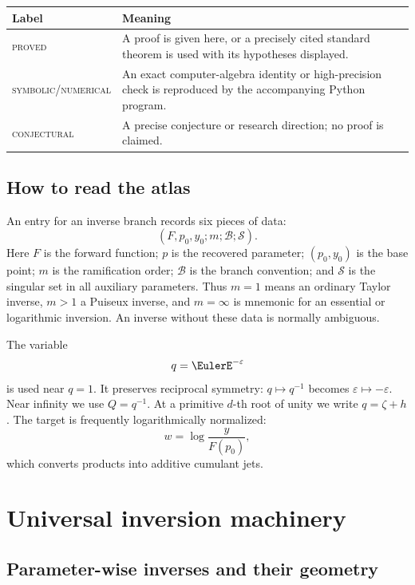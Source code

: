 \documentclass[11pt,letterpaper,oneside,openany]{book}
\theoremstyle{definition}
\theoremstyle{remark}
\newcommand{\statusproved}{\textcolor{provedgreen}{\textsc{proved}}}
\newcommand{\statusnumerical}{\textcolor{numericalblue}{\textsc{symbolic/numerical}}}
\newcommand{\statusconjectural}{\textcolor{conjectureorange}{\textsc{conjectural}}}
\begin{document}
\begin{center}
\begin{tabularx}{0.96\textwidth}{@{}lX@{}}
\toprule
Label & Meaning \\
\midrule
\statusproved & A proof is given here, or a precisely cited standard theorem is
used with its hypotheses displayed. \\
\statusnumerical & An exact computer-algebra identity or high-precision check is
reproduced by the accompanying Python program. \\
\statusconjectural & A precise conjecture or research direction; no proof is
claimed. \\
\bottomrule
\end{tabularx}
\end{center}

\chapter*{How to read the atlas}
An entry for an inverse branch records six pieces of data:
\[
 (F,p_0,y_0;m;\mathcal B;\mathcal S).
\]
Here \(F\) is the forward function; \(p\) is the recovered parameter;
\((p_0,y_0)\) is the base point; \(m\) is the ramification order; \(\mathcal
B\) is the branch convention; and \(\mathcal S\) is the singular set in all
auxiliary parameters.  Thus \(m=1\) means an ordinary Taylor inverse,
\(m>1\) a Puiseux inverse, and \(m=\infty\) is mnemonic for an essential or
logarithmic inversion.  An inverse without these data is normally ambiguous.

The variable
\[
 q=\EulerE^{-\varepsilon}
\]
is used near \(q=1\).  It preserves reciprocal symmetry: \(q\mapsto q^{-1}\)
becomes \(\varepsilon\mapsto-\varepsilon\).  Near infinity we use
\(Q=q^{-1}\).  At a primitive \(d\)-th root of unity we write \(q=\zeta+h\).
The target is frequently logarithmically normalized:
\[
 w=\log\frac{y}{F(p_0)},
\]
which converts products into additive cumulant jets.

\tableofcontents

\mainmatter

\part{Universal inversion machinery}

\chapter{Parameter-wise inverses and their geometry}
\end{document}
